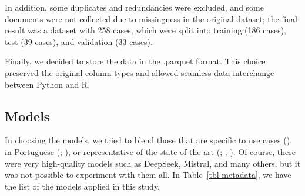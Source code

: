 \documentclass[
  12pt,
]{article}
\begin{document}
In addition, some duplicates and redundancies were excluded, and some
documents were not collected due to missingness in the original dataset;
the final result was a dataset with 258 cases, which were split into
training (186 cases), test (39 cases), and validation (33 cases).

Finally, we decided to store the data in the .parquet format. This
choice preserved the original column types and allowed seamless data
interchange between Python and R.

\subsection{Models}\label{sec-models}

In choosing the models, we tried to blend those that are specific to use
cases (), in Portuguese (; ), or
representative of the state-of-the-art
(;
;
). Of course, there
were very high-quality models such as DeepSeek, Mistral, and many
others, but it was not possible to experiment with them all. In
Table~\ref{tbl-metadata}, we have the list of the models applied in this
study.

\begingroup\fontsize{9}{11}\selectfont
\end{document}
